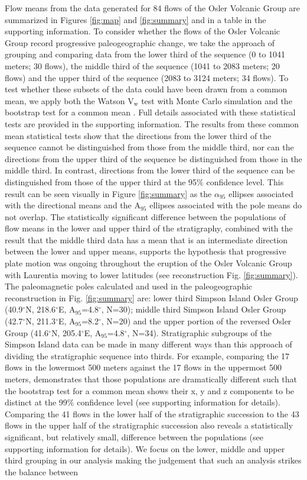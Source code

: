 \documentclass[draft,gc]{AGUTeX}
\begin{document}
\begin{article}
Flow means from the data generated for 84 flows of the Osler Volcanic Group are summarized in Figures \ref{fig:map} and \ref{fig:summary} and in a table in the supporting information. To consider whether the flows of the Osler Volcanic Group record progressive paleogeographic change, we take the approach of grouping and comparing data from the lower third of the sequence (0 to 1041 meters; 30 flows), the middle third of the sequence (1041 to 2083 meters; 20 flows) and the upper third of the sequence (2083 to 3124 meters; 34 flows). To test whether these subsets of the data could have been drawn from a common mean, we apply both the Watson V$_{\mathrm w}$ test with Monte Carlo simulation \citep{Watson1983a} and the bootstrap test for a common mean \citep{Tauxe2010a}. Full details associated with these statistical tests are provided in the supporting information. The results from these common mean statistical tests show that the directions from the lower third of the sequence cannot be distinguished from those from the middle third, nor can the directions from the upper third of the sequence be distinguished from those in the middle third. In contrast, directions from the lower third of the sequence can be distinguished from those of the upper third at the 95$\%$ confidence level. This result can be seen visually in Figure \ref{fig:summary} as the $\alpha_{95}$ ellipses associated with the directional means and the A$_{95}$ ellipses associated with the pole means do not overlap. The statistically significant difference between the populations of flow means in the lower and upper third of the stratigraphy, combined with the result that the middle third data has a mean that is an intermediate direction between the lower and upper means, supports the hypothesis that progressive plate motion was ongoing throughout the eruption of the Osler Volcanic Group with Laurentia moving to lower latitudes (see reconstruction Fig. \ref{fig:summary}). The paleomagnetic poles calculated and used in the paleogeographic reconstruction in Fig. \ref{fig:summary} are: lower third Simpson Island Osler Group (40.9$^\circ$N, 218.6$^\circ$E, A$_{95}$=4.8$^\circ$, N=30); middle third Simpson Island Osler Group (42.7$^\circ$N, 211.3$^\circ$E, A$_{95}$=8.2$^\circ$, N=20)  and the upper portion of the reversed Osler Group (41.6$^\circ$N, 205.4$^\circ$E, A$_{95}$=4.8$^\circ$, N=34). Stratigraphic subgroups of the Simpson Island data can be made in many different ways than this approach of dividing the stratigraphic sequence into thirds. For example, comparing the 17 flows in the lowermost 500 meters against the 17 flows in the uppermost 500 meters, demonstrates that those populations are dramatically different such that the bootstrap test for a common mean shows their x, y and z components to be distinct at the 99$\%$ confidence level (see supporting information for details). Comparing the 41 flows in the lower half of the stratigraphic succession to the 43 flows in the upper half of the stratigraphic succession also reveals a statistically significant, but relatively small, difference between the populations (see supporting information for details). We focus on the lower, middle and upper third grouping in our analysis making the judgement that such an analysis strikes the balance between 
\end{article}
\end{document}
